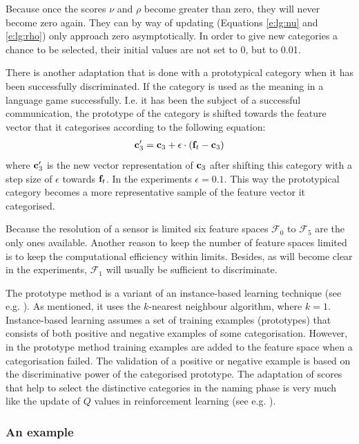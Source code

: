 Because once the scores $\nu$ and $\rho$ become greater than zero, they will never become zero again. They can by way of updating (Equations \ref{e:lg:nu} and \ref{e:lg:rho}) only approach zero asymptotically. In order to give new categories a chance to be selected, their initial values are not set to 0, but to 0.01.

There is another adaptation that is done with a prototypical category when it has been successfully discriminated. If the category is used as the meaning in a language game successfully. I.e. it has been the subject of a successful communication, the prototype of the category is shifted towards the feature vector that it categorises according to the following equation:
\begin{eqnarray} \label{eq:3.9}
{\bf c}_3' = {\bf c}_3 + \epsilon \cdot ({\bf f}_t - {\bf c}_3)
\end{eqnarray}
where ${\bf c}_3'$ is the new vector representation of  ${\bf c}_3$ after shifting this category with a step size of $\epsilon$ towards ${\bf f}_t$. In the experiments $\epsilon=0.1$. This way the prototypical category becomes a more representative sample of the feature vector it categorised.

Because the resolution of a sensor is limited six feature spaces ${\mathcal F}_0$ to ${\mathcal F}_5$ are the only ones available. Another reason to keep the number of feature spaces limited is to keep the computational efficiency within limits. Besides, as will become clear in the experiments, ${\mathcal F}_1$ will usually be sufficient to discriminate.


The prototype method is a variant of an instance-based learning technique (see e.g. \citealt{ahaetal:1991,mitchell:1997}). As mentioned, it uses the $k$-nearest neighbour algorithm, where $k=1$. Instance-based learning assumes a set of training examples (prototypes) that consists of both positive and negative examples of some categorisation. However, in the prototype method training examples are added to the feature space when a categorisation failed. The validation of a positive or negative example is based on the discriminative power of the categorised prototype. The adaptation of scores that help to select the distinctive categories in the naming phase is very much like the update of $Q$ values in reinforcement learning (see e.g. \citealt{suttonbarto:1998}). 

\subsubsection{An example}

